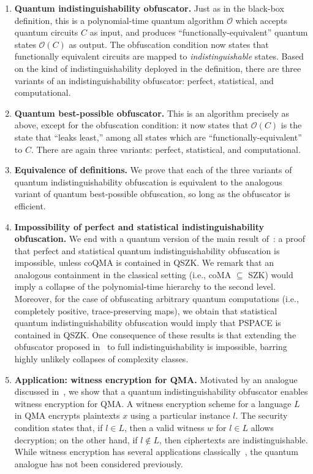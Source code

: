 \documentclass[envcountsame]{llncs}
\numberwithin{equation}{section}
\newcommand{\algo}{\mathcal}
\begin{document}
\begin{enumerate}
\item \textbf{Quantum indistinguishability obfuscator.} Just as in the black-box definition, this is a polynomial-time quantum algorithm $\algo O$ which accepts quantum circuits $C$ as input, and produces ``functionally-equivalent'' quantum states $\algo O(C)$ as output. The obfuscation condition now states that functionally equivalent circuits are mapped to \emph{indistinguishable} states. Based on the kind of indistinguishability deployed in the definition, there are three variants of an indistinguishability obfuscator: perfect, statistical, and computational.
\item \textbf{Quantum best-possible obfuscator.} This is an algorithm precisely as above, except for the obfuscation condition: it now states that $\algo O(C)$ is the state that ``leaks least,'' among all states which are ``functionally-equivalent'' to $C$. There are again three variants: perfect, statistical, and computational.
\item \textbf{Equivalence of definitions.} We prove that each of the three variants of quantum indistinguishability obfuscation is equivalent to the analogous variant of quantum best-possible obfuscation, so long as the obfuscator is efficient.
\item \textbf{Impossibility of perfect and statistical indistinguishability obfuscation.} We end with a quantum version of the main result of~\cite{GR07}: a proof that perfect and statistical quantum indistinguishability obfuscation is impossible, unless coQMA is contained in QSZK. We remark that an analogous containment in the classical setting (i.e., coMA $\subseteq$ SZK) would imply a collapse of the polynomial-time hierarchy to the second level. Moreover, for the case of obfuscating arbitrary quantum computations (i.e., completely positive, trace-preserving maps), we obtain that statistical quantum indistinguishability obfuscation would imply that PSPACE is contained in QSZK. One consequence of these results is that extending the obfuscator proposed in~\cite{AJJ14} to full indistinguishability is impossible, barring highly unlikely collapses of complexity classes.
\item \textbf{Application: witness encryption for QMA.} Motivated by an analogue discussed in~\cite{GGSW13, GGHRSW13}, we show that a quantum indistinguishability obfuscator enables witness encryption for QMA. A witness encryption scheme for a language $L$ in QMA encrypts plaintexts $x$ using a particular instance $l$. The security condition states that, if $l \in L$, then a valid witness $w$ for $l \in L$ allows decryption; on the other hand, if $l \notin L$, then ciphertexts are indistinguishable. While witness encryption has several applications classically~\cite{GGSW13}, the quantum analogue has not been considered previously.
\end{enumerate}
\end{document}

